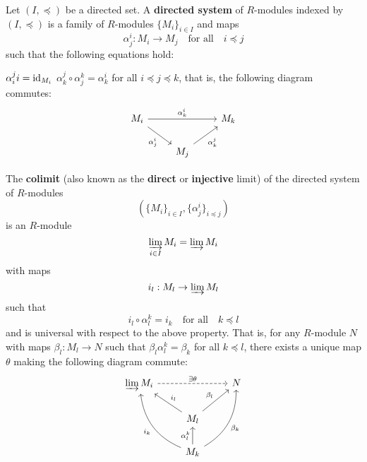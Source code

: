 \begin{defn}[1.13]
	\begin{enum}
		\io Let $(I,\preceq)$ be a directed set.
		A \textbf{directed system} of $R$-modules indexed by $(I,\preceq)$ is a family of $R$-modules $\{M_i\}_{i \in I}$ and maps
		\[\alpha_j^i: M_i \to M_j \quad \text{for all} \quad i \preceq j\]
		such that the following equations hold:
		\begin{enum}
			\io $\alpha_i^ji= \operatorname{id}_{M_i}$
			\io $\alpha_k^j \circ \alpha_j^k = \alpha_k^i$ for all $i \preceq j \preceq k$, that is, the following diagram commutes:
			\[
			\begin{tikzcd}
				M_i \arrow[rd, "\alpha_j^i"'] \arrow[rr, "\alpha_k^i"] &  & M_k \\
				& M_j \arrow[ru, "\alpha_k^j"'] & 
			\end{tikzcd}
			\]
		\end{enum}
		\io The \textbf{colimit} (also known as the \textbf{direct} or \textbf{injective} limit)
		of the directed system of $R$-modules
		\[\left(\{M_i\}_{i \in I}, \{\alpha_j^i\}_{i \preceq j}\right)\]
		is an $R$-module
		\[\varinjlim_{i \in I} M_i = \varinjlim M_i\]
		with maps
		\[i_l: M_l \to \varinjlim M_l\]
		such that
		\[i_l \circ \alpha_l^k = i_k \quad \text{for all} \quad k \preceq l\]
		and is universal with respect to the above property.
		That is, for any $R$-module $N$ with maps $\beta_l: M_l \to N$ such that $\beta_l\alpha_l^k=\beta_k$ for all $k \preceq l$, there exists a unique map $\theta$ making the following diagram commute:
		\[
		\begin{tikzcd}
			\varinjlim M_i \arrow[rr, "\exists \theta", dashed] &  & N \\
			& M_l \arrow[lu, "i_l"'] \arrow[ru, "\beta_l"] &  \\
			& M_k \arrow[luu, "i_k", bend left] \arrow[ruu, "\beta_k"', bend right] \arrow[u, "\alpha_l^k"] & 
		\end{tikzcd}
		\]
	\end{enum}
\end{defn}